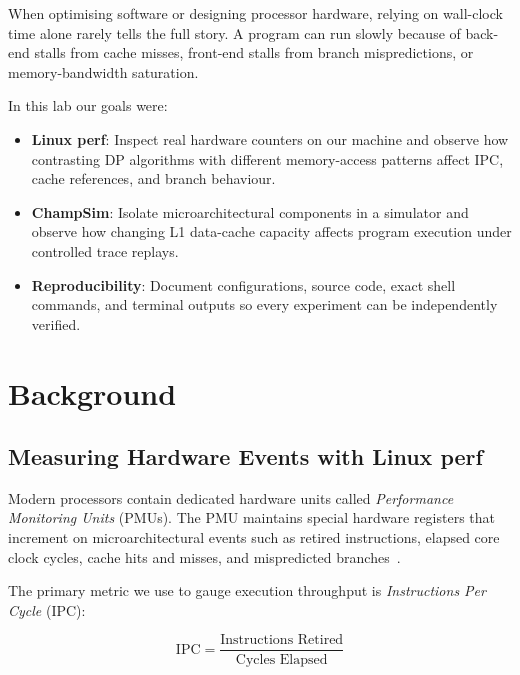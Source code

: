\documentclass[11pt,a4paper]{article}
\begin{document}
When optimising software or designing processor hardware, relying on wall-clock
time alone rarely tells the full story.  A program can run slowly because of
back-end stalls from cache misses, front-end stalls from branch mispredictions,
or memory-bandwidth saturation.

In this lab our goals were:

\begin{itemize}[leftmargin=*]
    \item \textbf{Linux perf}: Inspect real hardware counters on our machine and
          observe how contrasting DP algorithms with different memory-access
          patterns affect IPC, cache references, and branch behaviour.
    \item \textbf{ChampSim}: Isolate microarchitectural components in a
          simulator and observe how changing L1 data-cache capacity affects
          program execution under controlled trace replays.
    \item \textbf{Reproducibility}: Document configurations, source code, exact
          shell commands, and terminal outputs so every experiment can be
          independently verified.
\end{itemize}

\section{Background}

\subsection{Measuring Hardware Events with Linux perf}

Modern processors contain dedicated hardware units called \emph{Performance
Monitoring Units} (PMUs).  The PMU maintains special hardware registers that
increment on microarchitectural events such as retired instructions, elapsed
core clock cycles, cache hits and misses, and mispredicted branches~\cite{gregg2020}.

The primary metric we use to gauge execution throughput is
\emph{Instructions Per Cycle} (IPC):

\begin{equation}
    \text{IPC} = \frac{\text{Instructions Retired}}{\text{Cycles Elapsed}}
    \label{eq:ipc}
\end{equation}
\end{document}
